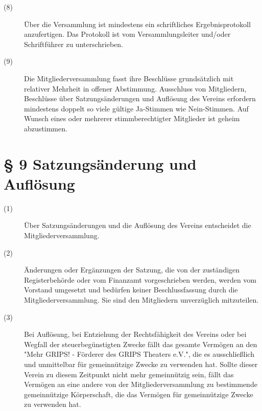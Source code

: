 \documentclass[a4paper,12pt]{scrartcl}
\begin{document}
\begin{description}
\item[(8)] Über die Versammlung ist mindestens ein schriftliches Ergebnisprotokoll anzufertigen. Das Protokoll ist vom Versammlungsleiter und/oder Schriftführer zu unterschrieben.
\item[(9)] Die Mitgliederversammlung fasst ihre Beschlüsse grundsätzlich mit relativer Mehrheit in offener Abstimmung. Ausschluss von Mitgliedern, Beschlüsse über Satzungsänderungen und Auflösung des Vereins erfordern mindestens doppelt so viele gültige Ja-Stimmen wie Nein-Stimmen. Auf Wunsch eines oder mehrerer stimmberechtigter Mitglieder ist geheim abzustimmen.

\end{description}


\section*{\S{} 9 Satzungsänderung und Auflösung}
\begin{description} 

\item[(1)] Über Satzungsänderungen und die Auflösung des Vereins entscheidet die Mitgliederversammlung.
\item[(2)] Änderungen oder Ergänzungen der Satzung, die von der zuständigen Registerbehörde oder vom Finanzamt vorgeschrieben werden, werden vom Vorstand umgesetzt und bedürfen keiner Beschlussfassung durch die Mitgliederversammlung. Sie sind den Mitgliedern unverzüglich mitzuteilen.
\item[(3)] Bei Auflösung, bei Entziehung der Rechtsfähigkeit des Vereins oder bei Wegfall der steuerbegünstigten Zwecke fällt das gesamte Vermögen an den "Mehr GRIPS! - Förderer des GRIPS Theaters e.V.", die es ausschließlich und unmittelbar für gemeinnützige Zwecke zu verwenden hat. Sollte dieser Verein zu diesem Zeitpunkt nicht mehr gemeinnützig sein, fällt das Vermögen an eine andere von der Mitgliederversammlung zu bestimmende gemeinnützige Körperschaft, die das Vermögen für gemeinnützige Zwecke zu verwenden hat.

\end{description}
\end{document}
